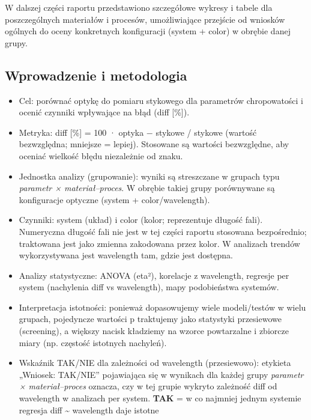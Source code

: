 \documentclass[
  10pt,
]{article}
\providecommand{\tightlist}{%
  \setlength{\itemsep}{0pt}\setlength{\parskip}{0pt}}
\begin{document}
W dalszej części raportu przedstawiono szczegółowe wykresy i tabele dla
poszczególnych materiałów i procesów, umożliwiające przejście od
wniosków ogólnych do oceny konkretnych konfiguracji (system + color) w
obrębie danej grupy.

\subsection{Wprowadzenie i metodologia}\label{wprowadzenie-i-metodologia}

\begin{itemize}
\tightlist
\item
  Cel: porównać optykę do pomiaru stykowego dla parametrów chropowatości
  i ocenić czynniki wpływające na błąd (\textbar diff\textbar{}
  {[}\%{]}).
\item
  Metryka: \textbar diff\textbar{} {[}\%{]} = 100 · \textbar optyka −
  stykowe\textbar{} / stykowe (wartość bezwzględna; mniejsze = lepiej).
  Stosowane są wartości bezwzględne, aby oceniać wielkość błędu
  niezależnie od znaku.
\item
  Jednostka analizy (grupowanie): wyniki są streszczane w grupach typu
  \emph{parametr × materiał--proces}. W obrębie takiej grupy
  porównywane są konfiguracje optyczne (system + color/wavelength).
\item
  Czynniki: system (układ) i color (kolor; reprezentuje długość fali).
  Numeryczna długość fali nie jest w tej części raportu stosowana
  bezpośrednio; traktowana jest jako zmienna zakodowana przez kolor. W
  analizach trendów wykorzystywana jest wavelength tam, gdzie jest
  dostępna.
\item
  Analizy statystyczne: ANOVA (eta²), korelacje z wavelength, regresje
  per system (nachylenia \textbar diff\textbar{} vs wavelength), mapy
  podobieństwa systemów.
\item
  Interpretacja istotności: ponieważ dopasowujemy wiele modeli/testów w
  wielu grupach, pojedyncze wartości p traktujemy jako statystyki
  przesiewowe (screening), a większy nacisk kładziemy na wzorce
  powtarzalne i zbiorcze miary (np. częstość istotnych nachyleń).
\item
  Wskaźnik TAK/NIE dla zależności od wavelength (przesiewowo): etykieta
  „Wniosek: TAK/NIE'' pojawiająca się w wynikach dla każdej grupy
  \emph{parametr × materiał--proces} oznacza, czy w tej grupie wykryto
  zależność \textbar diff\textbar{} od wavelength w analizach per
  system. \textbf{TAK} = w co najmniej jednym systemie regresja
  \textbar diff\textbar{} \textasciitilde{} wavelength daje istotne

\end{itemize}
\end{document}
